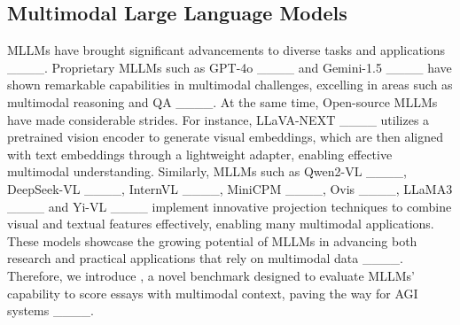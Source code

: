 \subsection{Multimodal Large Language Models}
MLLMs have brought significant advancements to diverse tasks and applications ____. Proprietary MLLMs such as GPT-4o ____ and Gemini-1.5 ____ have shown remarkable capabilities in multimodal challenges, excelling in areas such as multimodal reasoning and QA ____. At the same time, Open-source MLLMs have made considerable strides. For instance, LLaVA-NEXT ____ utilizes a pretrained vision encoder to generate visual embeddings, which are then aligned with text embeddings through a lightweight adapter, enabling effective multimodal understanding. Similarly, MLLMs such as Qwen2-VL ____, DeepSeek-VL ____, InternVL ____, MiniCPM ____, Ovis ____, LLaMA3 ____ and Yi-VL ____ implement innovative projection techniques to combine visual and textual features effectively, enabling many multimodal applications. These models showcase the growing potential of MLLMs in advancing both research and practical applications that rely on multimodal data ____. Therefore, we introduce \dataset, a novel benchmark designed to evaluate MLLMs’ capability to score essays with multimodal context, paving the way for AGI systems ____.
\vspace{-2mm}